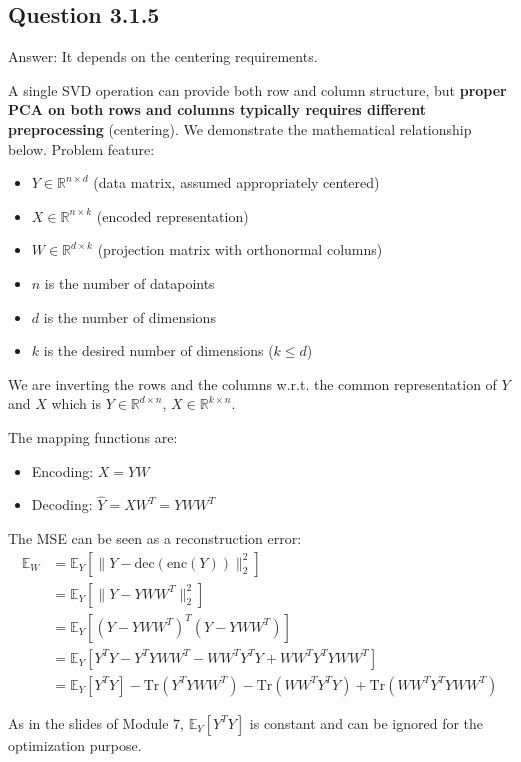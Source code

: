 \documentclass[a4paper]{scrartcl}
\begin{document}
\subsection*{Question 3.1.5}
Answer: It depends on the centering requirements.

A single SVD operation can provide both row and column structure, but \textbf{proper PCA on both rows and columns typically requires different preprocessing} (centering). We demonstrate the mathematical relationship below.
Problem feature:
\begin{itemize}
\item $Y \in \mathbb{R}^{n \times d}$ (data matrix, assumed appropriately centered)
\item $X \in \mathbb{R}^{n \times k}$ (encoded representation)
\item $W \in \mathbb{R}^{d \times k}$ (projection matrix with orthonormal columns)
\item $n$ is the number of datapoints
\item $d$ is the number of dimensions
\item $k$ is the desired number of dimensions ($k \leq d$)
\end{itemize}

We are inverting the rows and the columns w.r.t. the common representation of $Y$ and $X$ which is $Y \in \mathbb{R}^{d \times n}$, $X \in \mathbb{R}^{k \times n}$.

The mapping functions are:
\begin{itemize}
\item Encoding: $X = YW$
\item Decoding: $\hat{Y} = XW^T = YWW^T$
\end{itemize}

The MSE can be seen as a reconstruction error:
\begin{align*}
  \mathbb{E}_W &= \mathbb{E}_Y\left[\| Y - \text{dec}(\text{enc}(Y))\|_2^2 \right]\\
&= \mathbb{E}_Y\left[\| Y - YWW^T\|_2^2 \right]\\
&= \mathbb{E}_Y\left[(Y-YWW^T)^T(Y-YWW^T)\right]\\
&= \mathbb{E}_Y\left[Y^TY - Y^TYWW^T - WW^TY^TY + WW^TY^TYWW^T \right]\\
&= \mathbb{E}_Y[Y^TY] - \text{Tr}(Y^TYWW^T) - \text{Tr}(WW^TY^TY) + \text{Tr}(WW^TY^TYWW^T)
\end{align*}

As in the slides of Module 7, $\mathbb{E}_Y[Y^TY]$ is constant and can be ignored for the optimization purpose.
\end{document}
